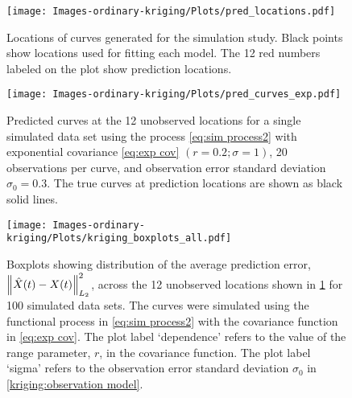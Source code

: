 \begin{figure}
	\begin{center}
		\texttt{[image: Images-ordinary-kriging/Plots/pred\_locations.pdf]} 
	\end{center}
	\caption{Locations of curves generated for the simulation study. Black points show locations used for fitting each model. The 12 red numbers labeled on the plot show prediction locations.} \label{fig:pred locations} 
\end{figure}
\begin{figure}
	\begin{center}
		\texttt{[image: Images-ordinary-kriging/Plots/pred\_curves\_exp.pdf]} 
	\end{center}
	\caption{Predicted curves at the 12 unobserved locations for a single simulated data set using the process \ref{eq:sim process2} with exponential covariance \eqref{eq:exp cov} $(r = 0.2; \sigma = 1 )$, 20 observations per curve, and observation error standard deviation $\sigma_0 = 0.3$. The true curves at prediction locations are shown as black solid lines. } \label{fig:curve kriging predictions} 
\end{figure}
\begin{figure}
	\begin{center}
		\texttt{[image: Images-ordinary-kriging/Plots/kriging\_boxplots\_all.pdf]} 
	\end{center}
	\caption{Boxplots showing distribution of the average prediction error, $\left\|\hat{X}(t) - X(t)\right\|^2_{L_2}$, across the 12 unobserved locations shown in \ref{fig:pred locations} for 100 simulated data sets. The curves were simulated using the functional process in \eqref{eq:sim process2} with the covariance function in \eqref{eq:exp cov}. The plot label `dependence' refers to the value of the range parameter, $r$, in the covariance function. The plot label `sigma' refers to the observation error standard deviation $\sigma_0$ in \eqref{kriging:observation model}. } 
	\label{fig:boxplots pred mse} 
\end{figure}







